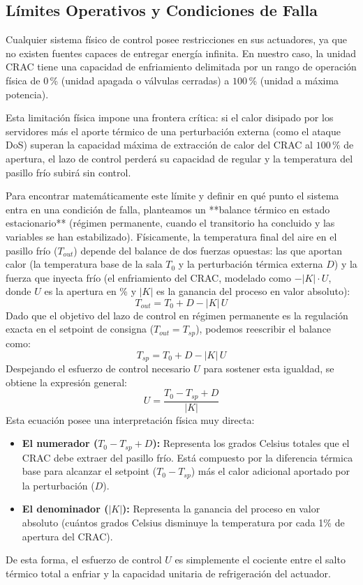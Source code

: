\documentclass[journal,twocolumn]{IEEEtran}
\begin{document}
\subsection{Límites Operativos y Condiciones de Falla}

Cualquier sistema físico de control posee restricciones en sus actuadores, ya que no existen fuentes capaces de entregar energía infinita. En nuestro caso, la unidad CRAC tiene una capacidad de enfriamiento delimitada por un rango de operación física de $0$\,\% (unidad apagada o válvulas cerradas) a $100$\,\% (unidad a máxima potencia). 

Esta limitación física impone una frontera crítica: si el calor disipado por los servidores más el aporte térmico de una perturbación externa (como el ataque DoS) superan la capacidad máxima de extracción de calor del CRAC al $100$\,\% de apertura, el lazo de control perderá su capacidad de regular y la temperatura del pasillo frío subirá sin control. 

Para encontrar matemáticamente este límite y definir en qué punto el sistema entra en una condición de falla, planteamos un **balance térmico en estado estacionario** (régimen permanente, cuando el transitorio ha concluido y las variables se han estabilizado). Físicamente, la temperatura final del aire en el pasillo frío ($T_{out}$) depende del balance de dos fuerzas opuestas: las que aportan calor (la temperatura base de la sala $T_0$ y la perturbación térmica externa $D$) y la fuerza que inyecta frío (el enfriamiento del CRAC, modelado como $-|K| \cdot U$, donde $U$ es la apertura en \% y $|K|$ es la ganancia del proceso en valor absoluto):
\begin{equation}
    T_{out} = T_0 + D - |K|\,U
\end{equation}
Dado que el objetivo del lazo de control en régimen permanente es la regulación exacta en el setpoint de consigna ($T_{out} = T_{sp}$), podemos reescribir el balance como:
\begin{equation}
    T_{sp} = T_0 + D - |K|\,U
\end{equation}
Despejando el esfuerzo de control necesario $U$ para sostener esta igualdad, se obtiene la expresión general:
\begin{equation}
    U = \frac{T_0 - T_{sp} + D}{|K|}
\end{equation}
Esta ecuación posee una interpretación física muy directa:
\begin{itemize}
    \item \textbf{El numerador ($T_0 - T_{sp} + D$):} Representa los grados Celsius totales que el CRAC debe extraer del pasillo frío. Está compuesto por la diferencia térmica base para alcanzar el setpoint ($T_0 - T_{sp}$) más el calor adicional aportado por la perturbación ($D$).
    \item \textbf{El denominador ($|K|$):} Representa la ganancia del proceso en valor absoluto (cuántos grados Celsius disminuye la temperatura por cada 1\% de apertura del CRAC).
\end{itemize}
De esta forma, el esfuerzo de control $U$ es simplemente el cociente entre el salto térmico total a enfriar y la capacidad unitaria de refrigeración del actuador.
\end{document}
